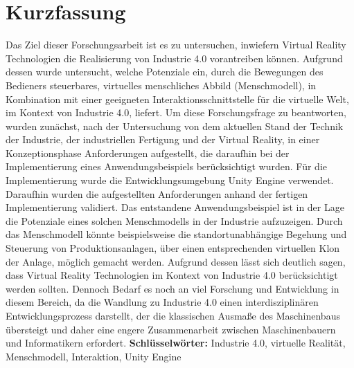 \chapter*{Kurzfassung}\label{cha:Kurzfassung}

Das Ziel dieser Forschungsarbeit ist es zu untersuchen, inwiefern Virtual Reality Technologien die Realisierung von Industrie 4.0 vorantreiben können. Aufgrund dessen wurde untersucht, welche Potenziale ein, durch die Bewegungen des Bedieners steuerbares, virtuelles menschliches Abbild (Menschmodell), in Kombination mit einer geeigneten Interaktionsschnittstelle für die virtuelle Welt, im Kontext von Industrie 4.0, liefert.
Um diese Forschungsfrage zu beantworten, wurden zunächst, nach der Untersuchung von dem aktuellen Stand der Technik der Industrie, der industriellen Fertigung und der Virtual Reality, in einer Konzeptionsphase Anforderungen aufgestellt, die daraufhin bei der Implementierung eines Anwendungsbeispiels berücksichtigt wurden. Für die Implementierung wurde die Entwicklungsumgebung Unity Engine verwendet. Daraufhin wurden die aufgestellten Anforderungen anhand der fertigen Implementierung validiert.
Das entstandene Anwendungsbeispiel ist in der Lage die Potenziale eines solchen Menschmodells in der Industrie aufzuzeigen. Durch das Menschmodell könnte beispielsweise die standortunabhängige Begehung und Steuerung von Produktionsanlagen, über einen entsprechenden virtuellen Klon der Anlage, möglich gemacht werden.
Aufgrund dessen lässt sich deutlich sagen, dass Virtual Reality Technologien im Kontext von Industrie 4.0 berücksichtigt werden sollten. Dennoch Bedarf es noch an viel Forschung und Entwicklung in diesem Bereich, da die Wandlung zu Industrie 4.0 einen interdisziplinären Entwicklungsprozess darstellt, der die klassischen Ausmaße des Maschinenbaus übersteigt und daher eine engere Zusammenarbeit zwischen Maschinenbauern und Informatikern erfordert.
\newline
\textbf{Schlüsselwörter:} Industrie 4.0, virtuelle Realität, Menschmodell, Interaktion, Unity Engine

\begingroup
\let\clearpage\relax

